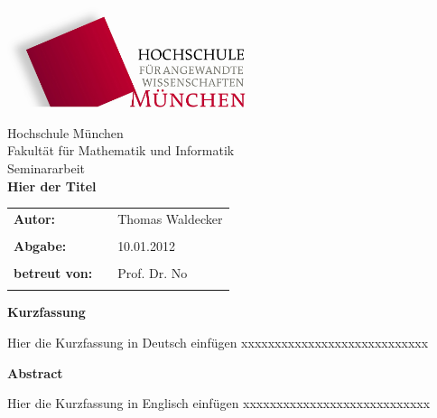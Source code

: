 %
\begin{titlepage}
\begin{flushright}
\includegraphics[width=70mm]{img/hm}%
\end{flushright}

\vspace*{20mm}
\begin{center}
{\Large Hochschule München}\\
{\large Fakultät für Mathematik und Informatik}\\

\vspace*{15mm}
{\huge Seminararbeit }\\

\vspace*{10mm}
{\huge \bfseries{ Hier der Titel }} \\
\vspace*{15mm} 
\end{center}

\vspace*{30mm}

\begin{tabular}{lll}
\textbf{\large {Autor:}} & & \large {Thomas Waldecker}\\
& & \\

\textbf{\large {Abgabe:}} & & \large {10.01.2012}\\
& & \\

\textbf{\large {betreut von:}} & & \large {Prof. Dr. No}\\
& & \\
\end{tabular}

\end{titlepage}


\thispagestyle{empty}
\clearpage

\begin{center}
{\Large \bfseries{ Kurzfassung }}\\
\end{center}

Hier die Kurzfassung in Deutsch einfügen
xxxxxxxxxxxxxxxxxxxxxxxxxxxx


\vspace*{10mm}
\begin{center}
{\Large \bfseries{ Abstract }}\\
\end{center}

Hier die Kurzfassung in Englisch einfügen
xxxxxxxxxxxxxxxxxxxxxxxxxxxx

\leereseite
\tableofcontents
\leereseite
